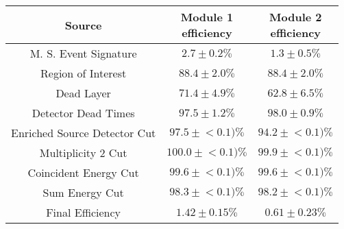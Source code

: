\begin{tabular}{|c|c|c|}
\hline
  Source & \makecell{Module 1\\efficiency} & \makecell{Module 2\\efficiency} \\
\hline
  M. S. Event Signature & $2.7 \pm 0.2\%$ & $1.3 \pm 0.5\%$ \\
  Region of Interest & $88.4 \pm 2.0\%$ & $88.4 \pm 2.0\%$ \\
  Dead Layer & $71.4 \pm 4.9\%$ & $62.8 \pm 6.5\%$ \\
  Detector Dead Times & $97.5 \pm 1.2\%$ & $98.0 \pm 0.9\%$ \\
  Enriched Source Detector Cut & $97.5 \pm{}<\!0.1)\%$ & $94.2 \pm{}<\!0.1)\%$ \\
  Multiplicity 2 Cut & $100.0 \pm{}<\!0.1)\%$ & $99.9 \pm{}<\!0.1)\%$ \\
  Coincident Energy Cut & $99.6 \pm{}<\!0.1)\%$ & $99.6 \pm{}<\!0.1)\%$ \\
  Sum Energy Cut & $98.3 \pm{}<\!0.1)\%$ & $98.2 \pm{}<\!0.1)\%$ \\
  \hline Final Efficiency & $1.42 \pm 0.15\%$ & $0.61 \pm 0.23\%$ \\
\hline
\end{tabular}
